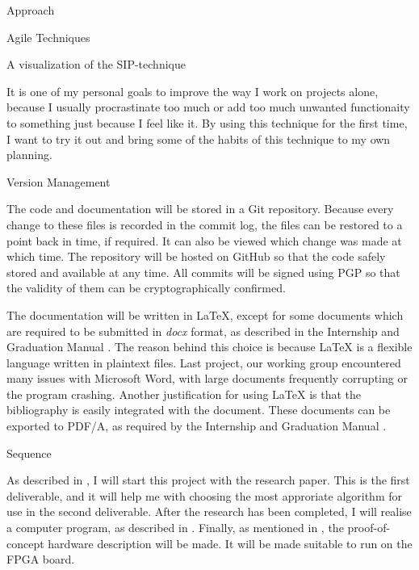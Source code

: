 \documentclass{matthijs}
\begin{document}
\begin{hoofdstuk}{Approach}
\begin{paragraaf}{Agile Techniques}
\begin{figuur}{A visualization of the SIP-technique}
			\end{figuur}

			It is one of my personal goals to improve the way I work on projects alone, because I usually procrastinate too much or add too much unwanted functionaity to something just because I feel like it.
			By using this technique for the first time, I want to try it out and bring some of the habits of this technique to my own planning.
		
		\end{paragraaf}

		\begin{paragraaf}{Version Management}

			The code and documentation will be stored in a Git repository.
			Because every change to these files is recorded in the commit log, the files can be restored to a point back in time, if required.
			It can also be viewed which change was made at which time.
			The repository will be hosted on GitHub so that the code safely stored and available at any time.
			All commits will be signed using PGP so that the validity of them can be cryptographically confirmed.
			
			\bigskip
			
			The documentation will be written in LaTeX, except for some documents which are required to be submitted in \textit{docx} format, as described in the Internship and Graduation Manual \cite{windesheim2021handleiding}.
			The reason behind this choice is because LaTeX is a flexible language written in plaintext files.
			Last project, our working group encountered many issues with Microsoft Word, with large documents frequently corrupting or the program crashing.
			Another justification for using LaTeX is that the bibliography is easily integrated with the document.
			These documents can be exported to PDF/A, as required by the Internship and Graduation Manual \cite{windesheim2021handleiding}.

		\end{paragraaf}

		\begin{paragraaf}{Sequence}

			As described in , I will start this project with the research paper.
			This is the first deliverable, and it will help me with choosing the most approriate algorithm for use in the second deliverable.
			After the research has been completed, I will realise a computer program, as described in .
			Finally, as mentioned in , the proof-of-concept hardware description will be made.
			It will be made suitable to run on the FPGA board.
			
		\end{paragraaf}

	\end{hoofdstuk}
\end{document}

